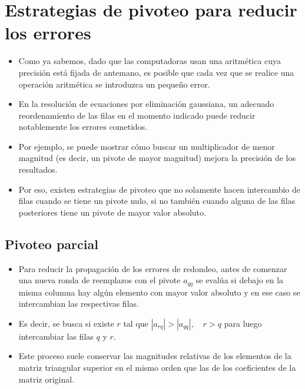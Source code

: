 \documentclass[]{book}
\providecommand{\tightlist}{%
  \setlength{\itemsep}{0pt}\setlength{\parskip}{0pt}}
\begin{document}
\hypertarget{estrategias-de-pivoteo-para-reducir-los-errores}{%
\section{Estrategias de pivoteo para reducir los errores}\label{estrategias-de-pivoteo-para-reducir-los-errores}}

\begin{itemize}
\tightlist
\item
  Como ya sabemos, dado que las computadoras usan una aritmética cuya precisión está fijada de antemano, es posible que cada vez que se realice una operación aritmética se introduzca un pequeño error.
\item
  En la resolución de ecuaciones por eliminación gaussiana, un adecuado reordenamiento de las filas en el momento indicado puede reducir notablemente los errores cometidos.
\item
  Por ejemplo, se puede mostrar cómo buscar un multiplicador de menor magnitud (es decir, un pivote de mayor magnitud) mejora la precisión de los resultados.
\item
  Por eso, existen estrategias de pivoteo que no solamente hacen intercambio de filas cuando se tiene un pivote nulo, si no también cuando alguna de las filas posteriores tiene un pivote de mayor valor absoluto.
\end{itemize}

\hypertarget{pivoteo-parcial}{%
\subsection{Pivoteo parcial}\label{pivoteo-parcial}}

\begin{itemize}
\tightlist
\item
  Para reducir la propagación de los errores de redondeo, antes de comenzar una nueva ronda de reemplazos con el pivote \(a_{qq}\) se evalúa si debajo en la misma columna hay algún elemento con mayor valor absoluto y en ese caso se intercambian las respectivas filas.
\item
  Es decir, se busca si existe \(r\) tal que \(|a_{rq}| > |a_{qq}|,\quad r>q\) para luego intercambiar las filas \(q\) y \(r\).
\item
  Este proceso suele conservar las magnitudes relativas de los elementos de la matriz triangular superior en el mismo orden que las de los coeficientes de la matriz original.
\end{itemize}
\end{document}
